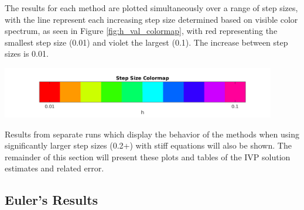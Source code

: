 \documentclass{article}
\begin{document}
The results for each method are plotted simultaneously over a range of step sizes, with the line represent each increasing step size determined based on visible color spectrum, as seen in Figure \ref{fig:h_val_colormap}, with red representing the smallest step size (0.01) and violet the largest (0.1). The increase between step sizes is 0.01. 

\begin{center}
  \includegraphics[width=0.9\textwidth]{../output/colormap.png}
  \label{fig:h_val_colormap}
\end{center}

Results from separate runs which display the behavior of the methods when using significantly larger step sizes (0.2+) with stiff equations will also be shown. The remainder of this section will present these plots and tables of the IVP solution estimates and related error. 


\subsection{Euler's Results}
\label{results:euler}
\end{document}
